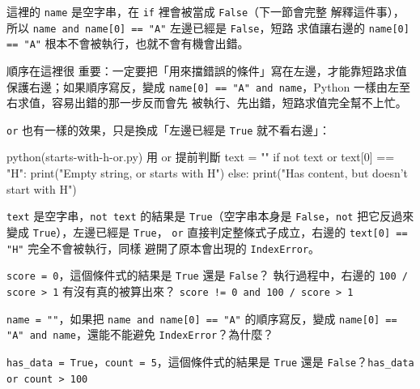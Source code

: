 
這裡的 \texttt{name} 是空字串，在 \texttt{if} 裡會被當成 \texttt{False}（下一節會完整
解釋這件事），所以 \texttt{name and name[0] == "A"} 左邊已經是 \texttt{False}，短路
求值讓右邊的 \texttt{name[0] == "A"} 根本不會被執行，也就不會有機會出錯。

順序在這裡很
重要：一定要把「用來擋錯誤的條件」寫在左邊，才能靠短路求值保護右邊；如果順序寫反，變成
\texttt{name[0] == "A" and name}，Python 一樣由左至右求值，容易出錯的那一步反而會先
被執行、先出錯，短路求值完全幫不上忙。

\texttt{or} 也有一樣的效果，只是換成「左邊已經是 \texttt{True} 就不看右邊」：

\begin{example}{python}{(starts-with-h-or.py) 用 or 提前判斷}
text = ""
if not text or text[0] == "H":
    print("Empty string, or starts with H")
else:
    print("Has content, but doesn't start with H")
\end{example}


\texttt{text} 是空字串，\texttt{not text} 的結果是 \texttt{True}（空字串本身是
\texttt{False}，\texttt{not} 把它反過來變成 \texttt{True}），左邊已經是 \texttt{True}，
\texttt{or} 直接判定整條式子成立，右邊的 \texttt{text[0] == "H"} 完全不會被執行，同樣
避開了原本會出現的 \texttt{IndexError}。


\begin{drills}[label=drills:short-circuit]
\item \texttt{score = 0}，這個條件式的結果是 \texttt{True} 還是 \texttt{False}？
執行過程中，右邊的 \texttt{100 / score > 1} 有沒有真的被算出來？
\texttt{score != 0 and 100 / score > 1}
\item \texttt{name = ""}，如果把 \texttt{name and name[0] == "A"} 的順序寫反，變成
\texttt{name[0] == "A" and name}，還能不能避免 \texttt{IndexError}？為什麼？
\item \texttt{has\_data = True}，\texttt{count = 5}，這個條件式的結果是
\texttt{True} 還是 \texttt{False}？\texttt{has\_data or count > 100}
\end{drills}


